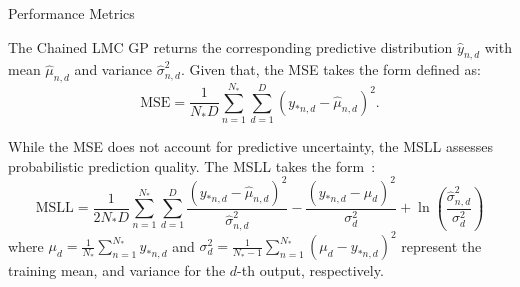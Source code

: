 \begin{frame}{Performance Metrics}

The Chained LMC GP returns the corresponding predictive distribution \( \hat{y}_{n,d}\) with mean \( \hat{\mu}_{n,d}\) and variance \( \hat{\sigma}^2_{n,d}\). Given that, the MSE takes the form defined as:
\begin{equation}\label{eq:mse}
	\text{MSE} = \frac{1}{N_{*}D} \sum_{n=1}^{N_*} \sum_{d=1}^{D} \left( y_{*n,d} - \hat{\mu}_{n,d} \right)^2.
\end{equation}

While the MSE does not account for predictive uncertainty, the MSLL assesses probabilistic prediction quality. The MSLL takes the form~\cite{RasmussenW06}:
\begin{equation}
	\text{MSLL} = \frac{1}{2N_{*}D} \sum_{n=1}^{N_*} \sum_{d=1}^{D}  \frac{(y_{*n,d} - \hat{\mu}_{n,d} )^2}{\hat{\sigma}^2_{n,d}}
	- \frac{(y_{*n,d} - \mu_d)^2}{\sigma_d^2} + \ln \left(\frac{\hat{\sigma}^2_{n,d}}{\sigma_d^2}\right)
\end{equation}
where \( \mu_d = \frac{1}{N_*} \sum_{n=1}^{N_*} y_{*n,d}\) and \( \sigma_d^2 = \frac{1}{N_* - 1} \sum_{n=1}^{N_*} (\mu_d - y_{*n,d})^2 \) represent the training mean, and variance for the $d$-th output, respectively.

\end{frame}

